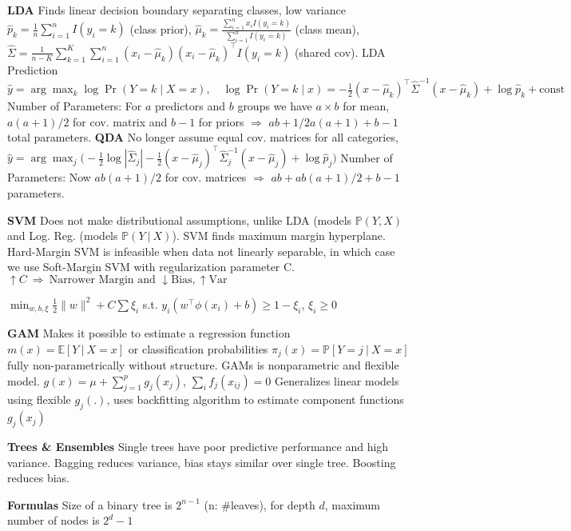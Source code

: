 \documentclass[9pt]{article}
\renewcommand\small{\footnotesize}
\newcommand{\toptopic}[1]{\textbf{{#1}}}
\newcommand{\highlight}[1]{\small{\textcolor{Sepia}{#1}}}
\newcommand{\topic}[1]{\small{\textbf{\textcolor{Sepia}{#1}}}}
\begin{document}
\begin{multicols*}{3}
\topic{LDA} Finds linear decision boundary separating classes, low variance
$\hat{p}_k = \frac{1}{n} \sum_{i=1}^n I(y_i = k)$ (class prior),  
$\hat{\mu}_k = \frac{\sum_{i=1}^n x_i I(y_i = k)}{\sum_{i=1}^n I(y_i = k)}$ (class mean),  
$\hat{\Sigma} = \frac{1}{n-K} \sum_{k=1}^K \sum_{i=1}^n (x_i - \hat{\mu}_k)(x_i - \hat{\mu}_k)^\top I(y_i = k)$ (shared cov).  
LDA Prediction $\hat{y} = \arg\max_k \log \Pr(Y=k \mid X=x), \quad 
\log \Pr(Y=k \mid x) = -\tfrac{1}{2}(x - \hat{\mu}_k)^\top \hat{\Sigma}^{-1}(x - \hat{\mu}_k) + \log \hat{p}_k + \text{const}$ Number of Parameters: For $a$ predictors and $b$ groups we have $a\times b$ for mean, $a(a+1)/2$ for cov. matrix and $b-1$ for priors $\Rightarrow$ \highlight{$ab +1/2a(a+1)+b-1$} total parameters.  
\topic{QDA} No longer assume equal cov. matrices for all categories,
$\hat{y} = \arg\max_j \big( -\tfrac{1}{2}\log|\hat{\Sigma}_j| - \tfrac{1}{2}(x-\hat{\mu}_j)^\top \hat{\Sigma}_j^{-1}(x-\hat{\mu}_j) + \log \hat{p}_j \big)$
Number of Parameters: Now $ab(a+1)/2$ for cov. matrices $\Rightarrow$ \highlight{$ab + ab(a+1)/2 + b-1$} parameters.


\toptopic{SVM}
Does not make distributional assumptions, unlike LDA (models $\mathbb{P}(Y,X)$ and Log. Reg. (models $\mathbb{P}(Y\ |\ X)$). SVM finds maximum margin hyperplane. Hard-Margin SVM is infeasible when data not linearly separable, in which case we use Soft-Margin SVM with regularization parameter C. $\uparrow C \ \Rightarrow \  \text{Narrower Margin and } \downarrow \text{Bias}, \uparrow \text{Var}$

$\min_{w,b,\xi} \frac12\|w\|^2 + C\sum\xi_i$  
s.t. $y_i(w^\top\phi(x_i)+b) \ge 1 - \xi_i$, $\xi_i \ge 0$

\toptopic{GAM}
Makes it possible to estimate a regression function $m(x)= \mathbb{E}[Y \ | \ X=x]$ or classification probabilities $\pi_j(x) = \mathbb{P}[Y = j \ | \ X = x]$ fully non-parametrically without structure. GAMs is nonparametric and flexible model.
$g(x) = \mu + \sum_{j=1}^p g_j(x_j)$, \quad $\sum_i f_j(x_{ij}) = 0$ Generalizes linear models using flexible $g_j(.)$, uses backfitting algorithm to estimate component functions $g_j(x_j)$

\toptopic{Trees \& Ensembles}
\highlight{Single trees} have poor predictive performance and high variance. \highlight{Bagging} reduces variance, bias stays similar over single tree. \highlight{Boosting} reduces bias.


\topic{Formulas} Size of a binary tree is $2^{n-1}$ (n: #leaves), for depth $d$, maximum number of nodes is $2^d -1$



\end{multicols*}
\end{document}
